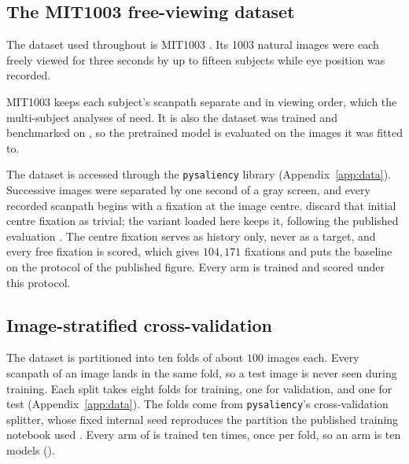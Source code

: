 \subsection{The MIT1003 free-viewing dataset}
\label{subsec:mit1003}

The dataset used throughout is MIT1003 \citep{judd2009mit1003}. Its 1003 natural images were each freely
viewed for three seconds by up to fifteen subjects while eye position was recorded.

MIT1003 keeps each subject's scanpath separate and in viewing order, which the multi-subject analyses
of  need.
It is also the dataset \dg{} was trained and benchmarked on \citep{kummerer2022deepgaze3}, so the
pretrained model is evaluated on the images it was fitted to.

The dataset is accessed through the \texttt{pysaliency} library (Appendix~\ref{app:data}).
Successive images were separated by one second of a gray screen, and every recorded scanpath begins with
a fixation at the image centre. \citet{judd2009mit1003} discard that initial centre fixation as trivial;
the variant loaded here keeps it, following the published \dg{} evaluation
\citep{kummerer2022deepgaze3}.
The centre fixation serves as history only, never as a target, and every free fixation is scored, which
gives $104{,}171$ fixations and puts the baseline on the protocol of the published figure.
Every arm is trained and scored under this protocol.

\subsection{Image-stratified cross-validation}
\label{subsec:cv-split}

The dataset is partitioned into ten folds of about $100$ images each. Every scanpath of an image
lands in the same fold, so a test image is never seen during training.
Each split takes eight folds for training, one for validation, and one for test
(Appendix~\ref{app:data}). The folds come from \texttt{pysaliency}'s cross-validation splitter, whose
fixed internal seed reproduces the partition the published \dg{} training notebook used
\citep{deepgazepytorch}.
Every arm of  is trained ten times, once per fold, so an arm is ten models
().

